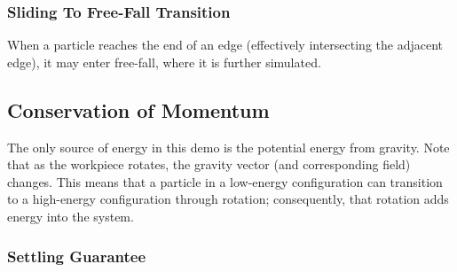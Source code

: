 		\subsubsection{Sliding To Free-Fall Transition}

When a particle reaches the end of an edge (effectively intersecting the adjacent edge), it may enter free-fall, where it is further simulated.








	\subsection{Conservation of Momentum}

		The only source of energy in this demo is the potential energy from gravity. Note that as the workpiece rotates, the gravity vector (and corresponding field) changes. This means that a particle in a low-energy configuration can transition to a high-energy configuration through rotation; consequently, that rotation adds energy into the system.

		\subsubsection{Settling Guarantee}

